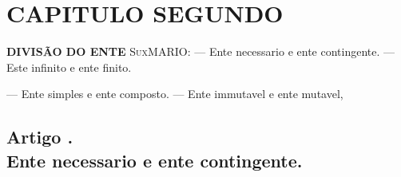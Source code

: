 


\chapter*{CAPITULO SEGUNDO}

\textbf{DIVISÃO DO ENTE} \textsc{SuxMARIO}: --- Ente necessario e ente contingente. --- Este infinito e ente finito.

--- Ente simples e ente composto. --- Ente immutavel e ente mutavel,


\section*{Artigo \textbar{}.\\ Ente necessario e ente contingente.}

